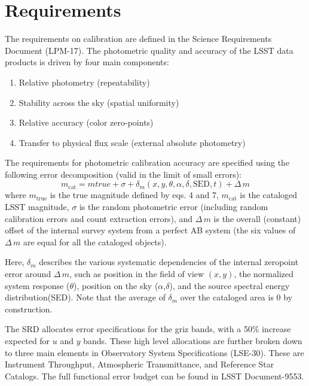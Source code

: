 \documentclass[SE,authoryear,lsstdraft,toc]{lsstdoc}
\newcommand{\mcat}{m_{\mathrm{cat}}}
\newcommand{\mtrue}{m_{\mathrm{true}}}
\newcommand{\deltam}{\delta_m}
\newcommand{\Deltam}{\Delta\,m}
\begin{document}
\section{Requirements}
The requirements on calibration are defined in the Science Requirements Document (LPM-17). The photometric quality and accuracy of the LSST data products is driven by four main components:
\begin{enumerate}
    \item Relative photometry (repeatability)
    \item Stability across the sky (spatial uniformity)
    \item Relative accuracy (color zero-points)
    \item Transfer to physical flux scale (external absolute photometry)
\end{enumerate}

The requirements for photometric calibration accuracy are specified using the
following error decomposition (valid in the limit of small errors):
%
\begin{equation}
    \mcat = mtrue +\sigma+\deltam (x,y,\theta,\alpha,\delta,\mathrm{SED},t)+\Deltam
\end{equation}
%
where $\mtrue$ is the true magnitude defined by eqs. 4 and 7, $\mcat$ is the
cataloged LSST magnitude, $\sigma$ is the random photometric error (including
random calibration errors and count extraction errors), and $\Deltam$ is the
overall (constant) offset of the internal survey system from a perfect AB
system (the six values of $\Deltam$ are equal for all the cataloged objects).

Here, $\deltam$ describes the various systematic dependencies of the internal
zeropoint error around $\Deltam$, such as position in the field of view $(x,
y)$, the normalized system response ($\theta$), position on the sky
($\alpha$,$\delta$), and the source spectral energy distribution(SED).  Note
that the average of $\deltam$ over the cataloged area is 0 by construction.

The SRD allocates error specifications for the griz bands, with a 50\% increase
expected for $u$ and $y$ bands. These high level allocations are further broken
down to three main elements in Observatory System Specifications
(LSE-30). These are Instrument Throughput, Atmospheric Transmittance, and
Reference Star Catalogs. The full functional error budget can be found in LSST
Document-9553.
\end{document}
